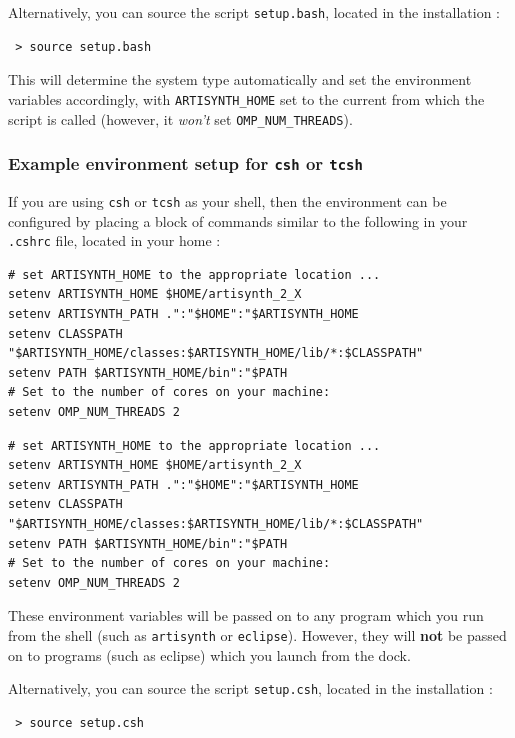 Alternatively, you can source the script {\tt setup.bash}, located in
the installation \directory{}:

\begin{verbatim}
 > source setup.bash
\end{verbatim}

This will determine the system type automatically and set the
environment variables accordingly, with {\tt ARTISYNTH\_HOME} set to the
current \directory{} from which the script is called (however,
it {\it won't} set {\tt OMP\_NUM\_THREADS}).

\subsubsection{Example environment setup for {\tt csh} or {\tt tcsh}}
\label{CshEnvironmentSetup}

If you are using {\tt csh} or {\tt tcsh} as your shell, then the
environment can be configured by placing a block of commands similar
to the following in your {\tt .cshrc} file, located in your home
\directory{}:

\ifLinux
\begin{lstlisting}[]
# set ARTISYNTH_HOME to the appropriate location ...
setenv ARTISYNTH_HOME $HOME/artisynth_2_X
setenv ARTISYNTH_PATH .":"$HOME":"$ARTISYNTH_HOME
setenv CLASSPATH "$ARTISYNTH_HOME/classes:$ARTISYNTH_HOME/lib/*:$CLASSPATH"
setenv PATH $ARTISYNTH_HOME/bin":"$PATH
# Set to the number of cores on your machine:
setenv OMP_NUM_THREADS 2 
\end{lstlisting}
\else\ifMacOS
\begin{lstlisting}[]
# set ARTISYNTH_HOME to the appropriate location ...
setenv ARTISYNTH_HOME $HOME/artisynth_2_X
setenv ARTISYNTH_PATH .":"$HOME":"$ARTISYNTH_HOME
setenv CLASSPATH "$ARTISYNTH_HOME/classes:$ARTISYNTH_HOME/lib/*:$CLASSPATH"
setenv PATH $ARTISYNTH_HOME/bin":"$PATH
# Set to the number of cores on your machine:
setenv OMP_NUM_THREADS 2 
\end{lstlisting}
\fi\fi

These environment variables will be passed on to any program which you
run from the shell (such as {\tt artisynth} or {\tt eclipse}).
\ifMacOS
However, they will {\bf not} be passed on to programs (such as eclipse)
which you launch from the dock.
\fi

Alternatively, you can source the script {\tt setup.csh}, located in
the installation \directory{}:

\begin{verbatim}
 > source setup.csh
\end{verbatim}

